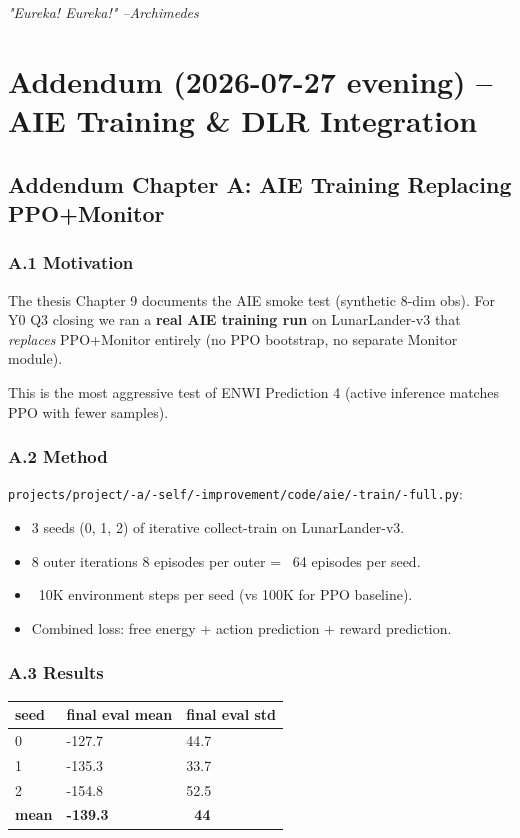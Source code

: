 \documentclass[11pt]{article}
\begin{document}
\textit{"Eureka! Eureka!" --Archimedes}


\hrulefill

\section*{Addendum (2026-07-27 evening) --AIE Training \& DLR Integration}

\subsection{Addendum Chapter A: AIE Training Replacing PPO+Monitor}

\subsubsection{A.1 Motivation}

The thesis Chapter 9 documents the AIE smoke test (synthetic 8-dim obs).
For Y0 Q3 closing we ran a \textbf{real AIE training run} on LunarLander-v3 that
\textit{replaces} PPO+Monitor entirely (no PPO bootstrap, no separate Monitor module).

This is the most aggressive test of ENWI Prediction 4 (active inference matches
PPO with fewer samples).

\subsubsection{A.2 Method}

\texttt{projects/project/-a/-self/-improvement/code/aie/-train/-full.py}:

\begin{itemize}
  \item 3 seeds (0, 1, 2) of iterative collect-train on LunarLander-v3.
  \item 8 outer iterations  8 episodes per outer = ~64 episodes per seed.
  \item ~10K environment steps per seed (vs 100K for PPO baseline).
  \item Combined loss: free energy + action prediction + reward prediction.
\end{itemize}


\subsubsection{A.3 Results}

\begin{tabular}{lll}
seed & final eval mean & final eval std \\
\hline
0 & -127.7 & 44.7 \\
1 & -135.3 & 33.7 \\
2 & -154.8 & 52.5 \\
\textbf{mean} & \textbf{-139.3} & \textbf{~44} \\
\end{tabular}
\end{document}
